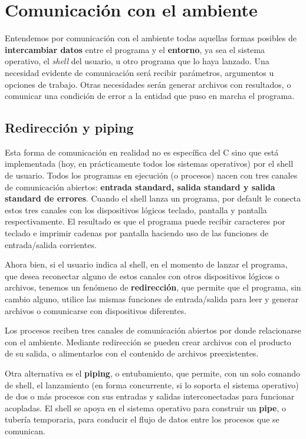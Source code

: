 



\chapter{Comunicación con el ambiente}
\label{tc-ambiente}



Entendemos por comunicación con el ambiente todas aquellas formas posibles de
\textbf{intercambiar datos} entre el programa y el \textbf{entorno}, ya sea el sistema operativo,
el \textit{shell} del usuario, u otro programa que lo haya lanzado. Una necesidad
evidente de comunicación será recibir parámetros, argumentos u opciones de
trabajo. Otras necesidades serán generar archivos con resultados, o comunicar
una condición de error a la entidad que puso en marcha el programa.

\section{Redirección y piping}
Esta forma de comunicación en realidad no es específica del C sino que está
implementada (hoy, en prácticamente todos los sistemas operativos) por el shell
de usuario. Todos los programas en ejecución (o procesos) nacen con tres
canales de comunicación abiertos: \textbf{entrada standard, salida standard y salida
standard de errores}. Cuando el shell lanza un programa, por default le conecta
estos tres canales con los dispositivos lógicos teclado, pantalla y pantalla
respectivamente. El resultado es que el programa puede recibir caracteres por
teclado e imprimir cadenas por pantalla haciendo uso de las funciones de
entrada/salida corrientes.

Ahora bien, si el usuario indica al shell, en el momento de lanzar el programa,
que desea reconectar alguno de estos canales con otros dispositivos lógicos o
archivos, tenemos un fenómeno de \textbf{redirección}, que permite que el programa, sin
cambio alguno, utilice las mismas funciones de entrada/salida para leer y
generar archivos o comunicarse con dispositivos diferentes.

            Los procesos reciben tres canales de comunicación abiertos por donde
 relacionarse con el ambiente. Mediante redirección se pueden crear archivos con
           el producto de su salida, o alimentarlos con el contenido de archivos
                                                                  preexistentes.

Otra alternativa es el \textbf{piping}, o entubamiento, que permite, con un solo comando
de shell, el lanzamiento (en forma concurrente, si lo soporta el sistema
operativo) de dos o más procesos con sus entradas y salidas interconectadas
para funcionar acopladas. El shell se apoya en el sistema operativo para
construir un \textbf{pipe}, o tubería temporaria, para conducir el flujo de datos entre
los procesos que se comunican.

